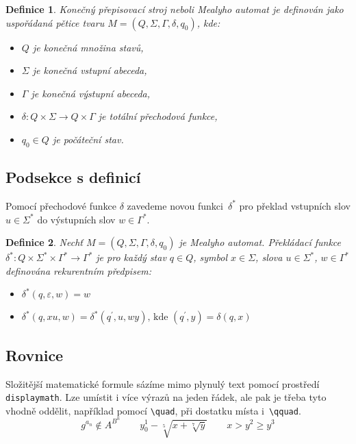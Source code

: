 \documentclass[11pt, a4paper, twocolumn]{article}
\newtheorem{definice}{Definice}
\begin{document}
\begin{definice}\label{ma}
\emph{Konečný přepisovací stroj} neboli \emph{Mea\-lyho automat} je definován jako uspořádaná pětice tvaru
$M = (Q, \mathit{\Sigma}, \mathit{\mathit{\Gamma}}, \delta, q_0)$, kde:
\begin{itemize}
    \item[$\bullet$] $Q$ je konečná množina \emph{stavů},
    \item[$\bullet$] $\mathit{\Sigma}$ je konečná \emph{vstupní abeceda},
    \item[$\bullet$] $\mathit{\Gamma}$ je konečná \emph{výstupní abeceda},
    \item[$\bullet$] $\delta:Q\times\mathit{\Sigma}\rightarrow Q\times\mathit{\Gamma}$ je totální \emph{přechodová funkce},
    \item[$\bullet$] $q_0 \in Q$ je \emph{počáteční stav}.
\end{itemize}
\end{definice}


\subsection{Podsekce s definicí}
Pomocí přechodové funkce $\delta$ zavedeme novou funkci~$\delta^{*}$ pro překlad vstupních slov $u\in\mathit{\Sigma}^{*}$ do výstupních slov $w \in\mathit{\Gamma}^{*}$.

\begin{definice}\label{pf}
Nechť $M = (Q, \mathit{\Sigma}, \mathit{\Gamma}, \delta, q_0)$ je Mealyho automat. \emph{Překládací funkce} $\delta^{*}:Q\times\mathit{\Sigma}^{*}\times\mathit{\Gamma}^{*}\rightarrow\mathit{\Gamma}^{*}$ je pro každý stav $q\in Q$, symbol $x\in\mathit{\Sigma}$, slova $u\in\mathit{\Sigma}^{*}$, $w \in\mathit{\Gamma}^{*}$ definována rekurentním předpisem:
\begin{itemize}
    \item[$\bullet$] $\delta^*(q, \varepsilon, w) = w$
    \item[$\bullet$] $\delta^*(q, xu, w) = \delta^*(q^\prime , u, wy) \text {, kde } (q^\prime , y) = \delta(q, x)$
\end{itemize}
\end{definice}

\subsection{Rovnice}
Složitější matematické formule sázíme mimo plynulý text pomocí prostředí \verb|displaymath|. Lze umístit i více výrazů na jeden řádek, ale pak je třeba tyto vhodně oddělit, například pomocí \verb|\quad|, při dostatku místa i~\verb|\qquad|.
$$
g^{a_{n}} \notin A^{B^{n}} 
\qquad y_{0}^{1}-\sqrt[5]{x + \sqrt[7]{y}}
\qquad x>y^{2} \geq y^{3} 
$$
\end{document}
